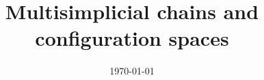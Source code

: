 \documentclass{amsart}
\title[Multisimplicial chains and configuration spaces]{Multisimplicial chains and configuration spaces}
\date{\today}
\begin{document}
%	
%	
%	
%	
%	
	
	
	\todos
%	
\end{document}
